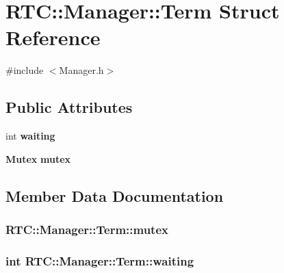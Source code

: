 \section{RTC::Manager::Term Struct Reference}
\label{structRTC_1_1Manager_1_1Term}


{\ttfamily \#include $<$Manager.h$>$}

\subsection*{Public Attributes}
\begin{DoxyCompactItemize}
\item 
int {\bf waiting}
\item 
{\bf Mutex} {\bf mutex}
\end{DoxyCompactItemize}


\subsection{Member Data Documentation}
\subsubsection[{mutex}]{ {\bf RTC::Manager::Term::mutex}}\label{structRTC_1_1Manager_1_1Term_ab4f986ea0c213e9d3048eb7f2b72a846}
\subsubsection[{waiting}]{\setlength{\rightskip}{0pt plus 5cm}int {\bf RTC::Manager::Term::waiting}}\label{structRTC_1_1Manager_1_1Term_abbe5810052f7e37453da75dc74032327}
